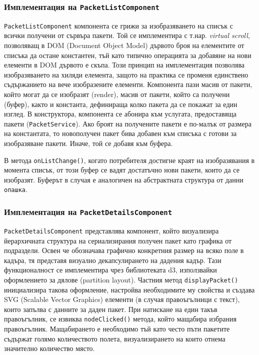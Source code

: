 \documentclass[12pt,a4paper,oneside]{book}
\begin{document}
\subsubsection{Имплементация на \texttt{PacketListComponent}}

\texttt{PacketListComponent} компонента се грижи за изобразяването на списък с
всички получени от сървъра пакети. Той се имплементира с т.нар. \textit{virtual
scroll}, позволяващ в DOM (Document Object Model) дървото броя на елементите от
списъка да остане константен, тъй като типично операцията за добавяне на нови
елементи в DOM дървото е скъпа. Този принцип на имплементация позволява изобразяването на хиляди
елемента, защото на практика се променя единствено съдържанието на вече
изобразените елементи.
Компонента пази масив от пакети, който могат да се изобразят (render), масив от
пакети, който са получени (буфер), както и
константа, дефинираща колко пакета да се покажат за един изглед. В
конструктора, компонента се абонира към услугата, предоставяща пакети
(\texttt{PacketService}). Ако броят на получените пакети е по-малък от размера
на константата, то новополучен пакет бива добавен към списъка с готови за
изобразяване пакети. Иначе, той се добавя към буфера.



В метода \texttt{onListChange()}, когато потребителя достигне краят на изобразявания в момента списък, от този буфер се вадят достатъчно нови пакети, които да се
изобразят. Буферът в случая е аналогичен на абстрактната структура от данни
\texttt{опашка}.



\subsubsection{Имплементация на \texttt{PacketDetailsComponent}}

\texttt{PacketDetailsComponent} представлява компонент, който визуализира
йерархичната структура на сериализирания получен пакет като графика от
подраздели. Освен че обозначава графично конкретния размер на всяко поле в
кадъра, тя представя визуално декапсулирането на дадения кадър. Тази
функционалност се имплементира чрез библиотеката d3, използвайки оформлението
за дялове (partition layout). Частния метод \texttt{displayPacket()} инициализира
такова оформление, настройва необходимите му свойства и създава SVG (Scalable
Vector Graphics) елементи (в случая правоъгълници с текст), които запълва с
данните за даден пакет.
При натискане на един такъв правоъгълник, се
извиква \texttt{nodeClicked()} метода, който мащабира избрания правоъгълник.
Мащабирането е необходимо тъй като често пъти пакетите съдържат голямо
количеството полета, визуализирането на които отнема значително количество
място.
\end{document}

